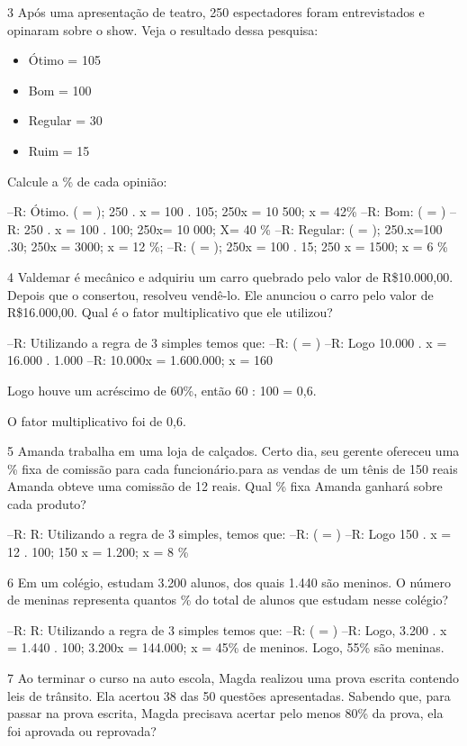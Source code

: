 {\num{3} Após uma apresentação de teatro, 250 espectadores foram entrevistados
e opinaram sobre o show. Veja o resultado dessa pesquisa:

\begin{itemize}
\item
  Ótimo = 105
\item
  Bom = 100
\item
  Regular = 30
\item
  Ruim = 15
\end{itemize}

Calcule a \% de cada opinião:

--R: Ótimo. ( = ); 250 . x = 100 . 105; 250x = 10 500; x = 42\% 
--R: Bom: ( = )
--R: 250 . x = 100 . 100; 250x= 10 000; X= 40 \%
--R: Regular: ( = ); 250.x=100 .30; 250x = 3000; x = 12 \%; 
--R: ( = ); 250x = 100 . 15; 250 x = 1500; x = 6 \%

\num{4} Valdemar é mecânico e adquiriu um carro quebrado pelo valor de
R\$10.000,00. Depois que o consertou, resolveu vendê-lo. Ele anunciou o
carro pelo valor de R\$16.000,00. Qual é o fator multiplicativo que ele
utilizou?

--R: Utilizando a regra de 3 simples temos que:
--R: ( = )
--R: Logo 10.000 . x = 16.000 . 1.000
--R: 10.000x = 1.600.000; x = 160

Logo houve um acréscimo de 60\%, então 60 : 100 = 0,6.

O fator multiplicativo foi de 0,6.

\num{5} Amanda trabalha em uma loja de calçados. Certo dia, seu gerente
ofereceu uma \% fixa de comissão para cada funcionário.para as vendas de
um tênis de 150 reais Amanda obteve uma comissão de 12 reais. Qual \%
fixa Amanda ganhará sobre cada produto?

--R: R: Utilizando a regra de 3 simples, temos que:
--R: ( = )
--R: Logo 150 . x = 12 . 100; 150 x = 1.200; x = 8 \%

\num{6} Em um colégio, estudam 3.200 alunos, dos quais 1.440 são meninos. O
número de meninas representa quantos \% do total de alunos que estudam
nesse colégio?

--R: R: Utilizando a regra de 3 simples temos que:
--R: ( = )
--R: Logo, 3.200 . x = 1.440 . 100; 3.200x = 144.000; x = 45\% de meninos. Logo, 55\% são meninas.

\num{7} Ao terminar o curso na auto escola, Magda realizou uma prova escrita
contendo leis de trânsito. Ela acertou 38 das 50 questões apresentadas.
Sabendo que, para passar na prova escrita, Magda precisava acertar pelo
menos 80\% da prova, ela foi aprovada ou reprovada?

}
